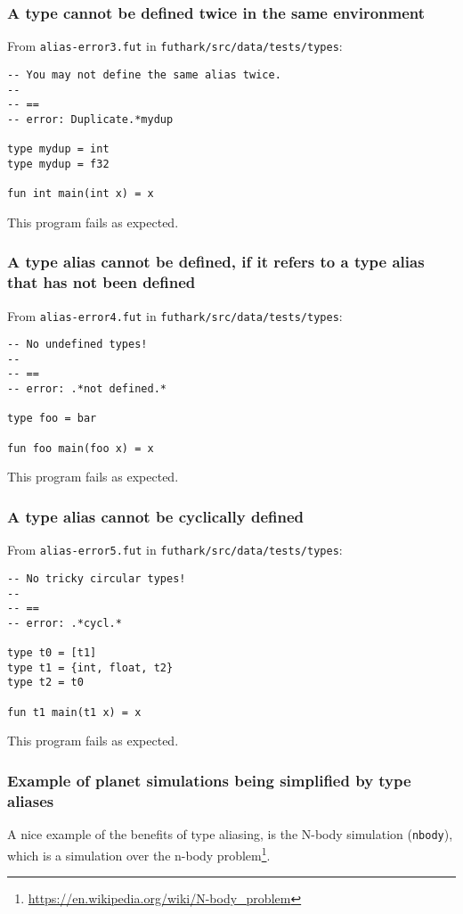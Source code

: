\subsubsection{A type cannot be defined twice in the same environment}
From \texttt{alias-error3.fut} in \texttt{futhark/src/data/tests/types}:
\begin{verbatim}
-- You may not define the same alias twice.
--
-- ==
-- error: Duplicate.*mydup

type mydup = int
type mydup = f32

fun int main(int x) = x
\end{verbatim}

This program fails as expected.

\subsubsection{A type alias cannot be defined, if it refers to a type alias that has not been defined}
From \texttt{alias-error4.fut} in \texttt{futhark/src/data/tests/types}:
\begin{verbatim}
-- No undefined types!
--
-- ==
-- error: .*not defined.*

type foo = bar

fun foo main(foo x) = x
\end{verbatim}
This program fails as expected.

\subsubsection{A type alias cannot be cyclically defined}
From \texttt{alias-error5.fut} in \texttt{futhark/src/data/tests/types}:
\begin{verbatim}
-- No tricky circular types!
--
-- ==
-- error: .*cycl.*

type t0 = [t1]
type t1 = {int, float, t2}
type t2 = t0

fun t1 main(t1 x) = x
\end{verbatim}
This program fails as expected.

\subsubsection{Example of planet simulations being simplified by type aliases}
A nice example of the benefits of type aliasing, is the N-body simulation
(\texttt{nbody}), which is a simulation over the n-body
problem\footnote{\url{https://en.wikipedia.org/wiki/N-body\_problem}}.

